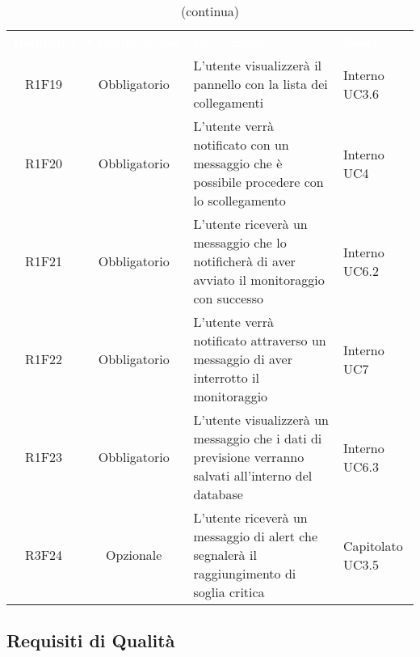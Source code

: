 \begin{table}[H]
\centering\renewcommand{\arraystretch}{1.5}
\caption{(continua)}
\vspace{0.2cm}
\begin{tabular}{ c  c  p{4 cm} C{2.5 cm} }
\textcolor{white}{\textbf{Requisito}} & \textcolor{white}{\textbf{Classificazione}} & 
\textcolor{white}{\textbf{Descrizione}} & \textcolor{white}{\textbf{Fonti}} \\
R1F19 & Obbligatorio & L’utente visualizzerà il pannello con la lista dei collegamenti & Interno UC3.6\\
R1F20 & Obbligatorio & L’utente verrà notificato con un messaggio che è possibile procedere con lo scollegamento &  Interno UC4\\
R1F21 & Obbligatorio & L’utente riceverà un messaggio che lo notificherà di aver avviato il monitoraggio con successo  & Interno UC6.2\\
R1F22 & Obbligatorio & L’utente verrà notificato attraverso un messaggio di aver interrotto il monitoraggio &  Interno UC7\\
R1F23 & Obbligatorio & L’utente visualizzerà un messaggio che i dati di previsione verranno salvati all’interno del database & Interno UC6.3\\
R3F24 & Opzionale & L’utente riceverà un messaggio di alert che segnalerà il raggiungimento di soglia critica & Capitolato UC3.5\\
\end{tabular}
\end{table}



 	\subsection{Requisiti di Qualità}

